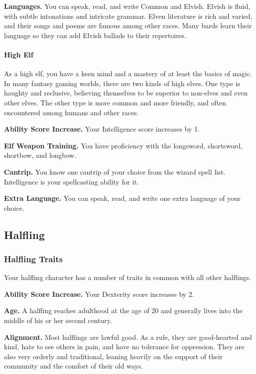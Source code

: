 \documentclass[
]{article}
\begin{document}
\textbf{Languages.} You can speak, read, and write Common and Elvish.
Elvish is fluid, with subtle intonations and intricate grammar. Elven
literature is rich and varied, and their songs and poems are famous
among other races. Many bards learn their language so they can add
Elvish ballads to their repertoires.

\hypertarget{high-elf}{%
\paragraph{High Elf}\label{high-elf}}

As a high elf, you have a keen mind and a mastery of at least the basics
of magic. In many fantasy gaming worlds, there are two kinds of high
elves. One type is haughty and reclusive, believing themselves to be
superior to non-elves and even other elves. The other type is more
common and more friendly, and often encountered among humans and other
races.

\textbf{Ability Score Increase.} Your Intelligence score increases by 1.

\textbf{Elf Weapon Training.} You have proficiency with the longsword,
shortsword, shortbow, and longbow.

\textbf{Cantrip.} You know one cantrip of your choice from the wizard
spell list. Intelligence is your spellcasting ability for it.

\textbf{Extra Language.} You can speak, read, and write one extra
language of your choice.

\hypertarget{halfling}{%
\subsection{Halfling}\label{halfling}}

\hypertarget{halfling-traits}{%
\subsubsection{Halfling Traits}\label{halfling-traits}}

Your halfling character has a number of traits in common with all other
halflings.

\textbf{Ability Score Increase.} Your Dexterity score increases by 2.

\textbf{Age.} A halfling reaches adulthood at the age of 20 and
generally lives into the middle of his or her second century.

\textbf{Alignment.} Most halflings are lawful good. As a rule, they are
good-hearted and kind, hate to see others in pain, and have no tolerance
for oppression. They are also very orderly and traditional, leaning
heavily on the support of their community and the comfort of their old
ways.
\end{document}
